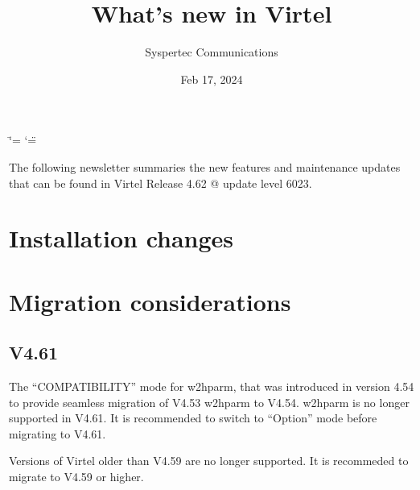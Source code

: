 \documentclass[letterpaper,10pt,english]{sphinxmanual}
\title{What's new in Virtel}
\date{Feb 17, 2024}
\author{Syspertec Communications}
\begin{document}
\ifdefined\shorthandoff
  \ifnum\catcode`\=\string=\active\shorthandoff{=}\fi
  \ifnum\catcode`\"=\active{}\fi
\fi

\pagestyle{empty}
\sphinxmaketitle
\pagestyle{plain}
\sphinxtableofcontents
\pagestyle{normal}
\label{\detokenize{TN202403::doc}}


\sphinxAtStartPar
The following newsletter summaries the new features and maintenance updates that can be found in Virtel Release 4.62 @ update level 6023.


\chapter{Installation changes}
\label{\detokenize{TN202403:installation-changes}}

\chapter{Migration considerations}
\label{\detokenize{TN202403:migration-considerations}}

\section{V4.61}
\label{\detokenize{TN202403:v4-61}}
\sphinxAtStartPar
{}

\sphinxAtStartPar
The “COMPATIBILITY” mode for w2hparm, that was introduced in version 4.54 to provide seamless migration of V4.53 w2hparm to V4.54. w2hparm is no longer supported in V4.61. It is recommended to switch to “Option” mode before migrating to V4.61.

\sphinxAtStartPar
{}

\sphinxAtStartPar
Versions of Virtel older than V4.59 are no longer supported. It is recommeded to migrate to V4.59 or higher.
\end{document}
